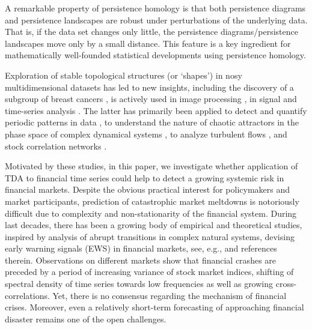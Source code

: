 \documentclass[preprint,12pt]{elsarticle}
\theoremstyle{definition}
\theoremstyle{remark}
\numberwithin{equation}{section}
\theoremstyle{definition}
\begin{document}
A remarkable property of persistence homology is that both persistence diagrams and persistence landscapes are robust under perturbations of the underlying  data. That is, if the data set changes only little, the persistence diagrams/persistence landscapes move only by a small distance. This feature is a key ingredient for mathematically well-founded statistical developments using persistence homology.


Exploration of stable topological structures (or `shapes') in nosy multidimensional datasets has led to new insights, including the discovery of a subgroup of breast cancers \cite{Nicolau11},  is actively used in image processing \cite{Carlsson08}, in signal and time-series analysis \cite{BerwaldG14,BerwaldGVJ15,Perea15a,Munch2016,Marco16,Seversky16}. The latter has primarily been applied to detect and quantify periodic patterns in data \cite{Emrani,Perea15b}, to understand the nature of chaotic attractors in the phase space of complex dynamical systems \cite{Maletic15},  to analyze turbulent flows \cite{Mischaikow-et-al}, and stock correlation networks \cite{Gidea17}.


Motivated by these studies, in this paper, we investigate whether application of TDA to financial time series could help to detect a growing systemic risk in financial markets. Despite the obvious practical interest for policymakers and market participants, prediction of catastrophic market meltdowns is notoriously difficult due to complexity and non-stationarity of the financial system. During last decades, there has been a growing body of empirical and theoretical studies, inspired by analysis of abrupt transitions in complex natural systems, devising  early warning signals (EWS) in financial markets, see, e.g.,
\cite{Guttal16} and references therein. Observations on different markets show that financial crashes are preceded by a period of increasing variance of stock market indices, shifting of spectral density of time series towards low frequencies as well as growing cross-correlations. Yet, there is no consensus regarding the mechanism of financial crises. Moreover, even a relatively short-term forecasting of approaching financial disaster remains one of the open challenges.
\end{document}
